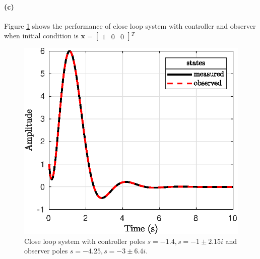 \paragraph{(c)} Figure \ref{fig:plot_equation_3d} shows the performance of close loop system with controller and observer when initial condition is $\mathbf{x}=\begin{bmatrix}
1 & 0 & 0
\end{bmatrix}$$^T$ 

\begin{figure}
\centering
\includegraphics{images/plot_question_3d.eps}
\caption{Close loop system with controller poles $s=-1.4,s=-1\pm2.15i$ and observer poles $s=-4.25,s=-3\pm6.4i$.}
\label{fig:plot_equation_3d}
\end{figure}